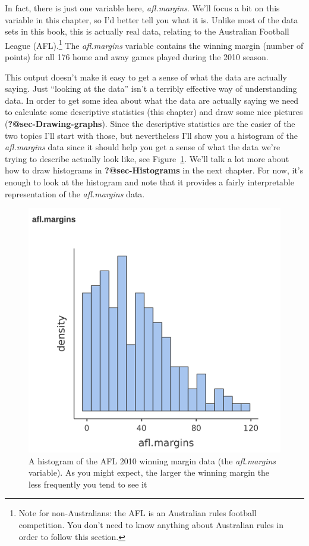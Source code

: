 \documentclass[
  a4paper,
]{book}
\begin{document}
In fact, there is just one variable here, \emph{afl.margins}. We'll
focus a bit on this variable in this chapter, so I'd better tell you
what it is. Unlike most of the data sets in this book, this is actually
real data, relating to the Australian Football League (AFL).\footnote{Note
  for non-Australians: the AFL is an Australian rules football
  competition. You don't need to know anything about Australian rules in
  order to follow this section.} The \emph{afl.margins} variable
contains the winning margin (number of points) for all 176 home and away
games played during the 2010 season.

This output doesn't make it easy to get a sense of what the data are
actually saying. Just ``looking at the data'' isn't a terribly effective
way of understanding data. In order to get some idea about what the data
are actually saying we need to calculate some descriptive statistics
(this chapter) and draw some nice pictures
(\textbf{?@sec-Drawing-graphs}). Since the descriptive statistics are
the easier of the two topics I'll start with those, but nevertheless
I'll show you a histogram of the \emph{afl.margins} data since it should
help you get a sense of what the data we're trying to describe actually
look like, see Figure~\ref{fig-fig4-2}. We'll talk a lot more about how
to draw histograms in \textbf{?@sec-Histograms} in the next chapter. For
now, it's enough to look at the histogram and note that it provides a
fairly interpretable representation of the \emph{afl.margins} data.

\begin{figure}

\includegraphics[width=1\textwidth,height=\textheight]{images/fig4-2.png} \hfill{}

\caption{\label{fig-fig4-2}A histogram of the AFL 2010 winning margin
data (the \emph{afl.margins} variable). As you might expect, the larger
the winning margin the less frequently you tend to see it}

\end{figure}
\end{document}
